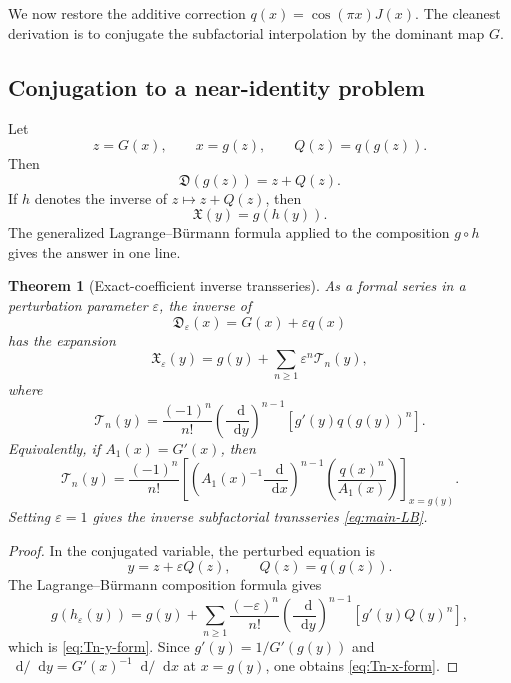\documentclass[11pt,oneside]{article}
\theoremstyle{plain}
\newtheorem{theorem}{Theorem}[section]
\theoremstyle{definition}
\theoremstyle{remark}
\newcommand{\dd}{\mathop{}\!\mathrm{d}}
\newcommand{\Dfrak}{\mathfrak{D}}
\newcommand{\Xfrak}{\mathfrak{X}}
\newcommand{\Tcal}{\mathcal{T}}
\begin{document}
We now restore the additive correction
\(q(x)=\cos(\pi x)J(x)\).  The cleanest derivation is to conjugate the
subfactorial interpolation by the dominant map \(G\).

\subsection{Conjugation to a near-identity problem}

Let
\begin{equation}
 z=G(x),\qquad x=g(z),\qquad Q(z)=q(g(z)).
 \label{eq:conjugation-def}
\end{equation}
Then
\begin{equation}
 \Dfrak(g(z))=z+Q(z).
 \label{eq:near-identity-z}
\end{equation}
If \(h\) denotes the inverse of \(z\mapsto z+Q(z)\), then
\begin{equation}
 \Xfrak(y)=g(h(y)).
 \label{eq:X-conjugated}
\end{equation}
The generalized Lagrange--B\"urmann formula applied to the composition
\(g\circ h\) gives the answer in one line.

\begin{theorem}[Exact-coefficient inverse transseries]
\label{thm:exact-coefficient-transseries}
As a formal series in a perturbation parameter \(\varepsilon\), the inverse of
\begin{equation}
 \Dfrak_\varepsilon(x)=G(x)+\varepsilon q(x)
 \label{eq:D-epsilon}
\end{equation}
has the expansion
\begin{equation}
 \Xfrak_\varepsilon(y)=g(y)+\sum_{n\ge1}\varepsilon^n\Tcal_n(y),
 \label{eq:X-epsilon-series}
\end{equation}
where
\begin{equation}
 \boxed{\quad
 \Tcal_n(y)=\frac{(-1)^n}{n!}
 \left(\frac{\dd}{\dd y}\right)^{n-1}
 \left[g'(y)q(g(y))^n\right].
 \quad}
 \label{eq:Tn-y-form}
\end{equation}
Equivalently, if \(A_1(x)=G'(x)\), then
\begin{equation}
 \boxed{\quad
 \Tcal_n(y)=\frac{(-1)^n}{n!}
 \left[
 \left(A_1(x)^{-1}\frac{\dd}{\dd x}\right)^{n-1}
 \left(\frac{q(x)^n}{A_1(x)}\right)
 \right]_{x=g(y)}.
 \quad}
 \label{eq:Tn-x-form}
\end{equation}
Setting \(\varepsilon=1\) gives the inverse subfactorial transseries
\eqref{eq:main-LB}.
\end{theorem}
\begin{proof}
In the conjugated variable, the perturbed equation is
\[
 y=z+\varepsilon Q(z),\qquad Q(z)=q(g(z)).
\]
The Lagrange--B\"urmann composition formula gives
\[
 g(h_\varepsilon(y))
 =g(y)+\sum_{n\ge1}\frac{(-\varepsilon)^n}{n!}
 \left(\frac{\dd}{\dd y}\right)^{n-1}
 \left[g'(y)Q(y)^n\right],
\]
which is \eqref{eq:Tn-y-form}.  Since
\(g'(y)=1/G'(g(y))\) and
\(\dd/\dd y=G'(x)^{-1}\dd/\dd x\) at \(x=g(y)\), one obtains
\eqref{eq:Tn-x-form}.
\end{proof}
\end{document}
